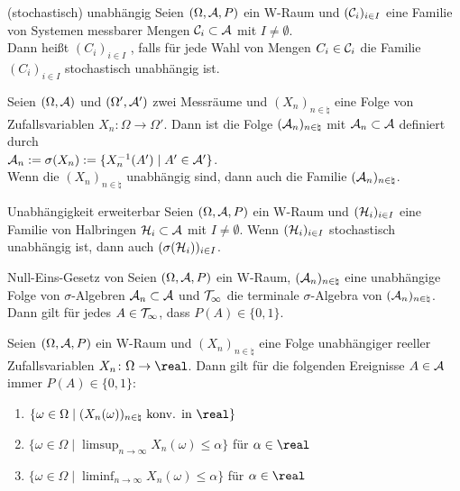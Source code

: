 \linie

\begin{Def}{(stochastisch) unabhängig}
    Seien $(\Omega, \mathcal{A}, P)$ ein W-Raum und
    $(\mathcal{C}_i)_{i \in I}$ eine Familie von Systemen messbarer Mengen $\mathcal{C}_i \subset \mathcal{A}$ mit
    $I \not= \emptyset$.\\
    Dann heißt $(C_i)_{i \in I}$ , falls
    für jede Wahl von Mengen $C_i \in \mathcal{C}_i$ die Familie $(C_i)_{i \in I}$
    stochastisch unabhängig ist.
\end{Def}

\begin{Bsp}
    Seien $(\Omega, \mathcal{A})$ und $(\Omega', \mathcal{A}')$ zwei Messräume und
    $(X_n)_{n \in \natural}$ eine Folge von Zufallsvariablen
    $X_n\colon \Omega \rightarrow \Omega'$.
    Dann ist die Folge $(\mathcal{A}_n)_{n \in \natural}$ mit $\mathcal{A}_n \subset \mathcal{A}$ definiert durch\\
    $\mathcal{A}_n := \sigma(X_n) := \{X_n^{-1}(A') \;|\; A' \in \mathcal{A}'\}$.\\
    Wenn die $(X_n)_{n \in \natural}$ unabhängig sind, dann auch die Familie
    $(\mathcal{A}_n)_{n \in \natural}$.
\end{Bsp}

\begin{Satz}{Unabhängigkeit erweiterbar}
    Seien $(\Omega, \mathcal{A}, P)$ ein W-Raum und
    $(\mathcal{H}_i)_{i \in I}$ eine Familie von Halbringen $\mathcal{H}_i \subset \mathcal{A}$ mit $I \not= \emptyset$.
    Wenn $(\mathcal{H}_i)_{i \in I}$ stochastisch unabhängig ist, dann auch
    $(\sigma(\mathcal{H}_i))_{i \in I}$.
\end{Satz}

\linie

\begin{Satz}{Null-Eins-Gesetz von \upshape\;\!}
    Seien $(\Omega, \mathcal{A}, P)$ ein W-Raum, $(\mathcal{A}_n)_{n \in \natural}$ eine unabhängige Folge
    von $\sigma$-Algebren $\mathcal{A}_n \subset \mathcal{A}$ und $\mathcal{T}_\infty$ die terminale $\sigma$-Algebra von
    $(\mathcal{A}_n)_{n \in \natural}$.\\
    Dann gilt für jedes $A \in \mathcal{T}_\infty$, dass $P(A) \in \{0, 1\}$.
\end{Satz}

\begin{Kor}
    Seien $(\Omega, \mathcal{A}, P)$ ein W-Raum und $(X_n)_{n \in \natural}$ eine Folge
    unabhängiger reeller Zufallsvariablen $X_n\colon \Omega \rightarrow \real$.
    Dann gilt für die folgenden Ereignisse $A \in \mathcal{A}$ immer $P(A) \in \{0, 1\}$:
    \begin{enumerate}
        \item
        $\{\omega \in \Omega \;|\; (X_n(\omega))_{n \in \natural} \text{ konv. in } \real\}$
        
        \item
        $\{\omega \in \Omega \;|\; \limsup_{n \to \infty} X_n(\omega) \le \alpha\}$
        für $\alpha \in \real$
        
        \item
        $\{\omega \in \Omega \;|\; \liminf_{n \to \infty} X_n(\omega) \le \alpha\}$
        für $\alpha \in \real$
    \end{enumerate}
\end{Kor}

